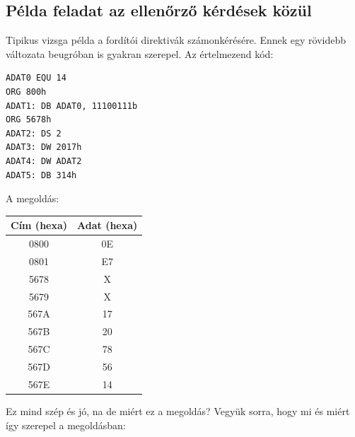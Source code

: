 \documentclass{article}
\begin{document}
\subsection{Példa feladat az ellenőrző kérdések közül}
Tipikus vizsga példa a fordítói direktivák számonkérésére. Ennek egy rövidebb változata beugróban is gyakran szerepel.
Az értelmezend kód:

\begin{lstlisting}[frame=single]
ADAT0 EQU 14
ORG 800h
ADAT1: DB ADAT0, 11100111b
ORG 5678h
ADAT2: DS 2
ADAT3: DW 2017h
ADAT4: DW ADAT2
ADAT5: DB 314h
\end{lstlisting}
A megoldás:

\begin{center}
\begin{tabular}{ |c|c| } 
 \hline
 Cím (hexa) & Adat (hexa) \\ \hline
 0800 & 0E \\ \hline
 0801 & E7 \\ \hline
 5678 & X \\ \hline
 5679 & X \\ \hline
 567A & 17 \\ \hline
 567B & 20 \\ \hline
 567C & 78 \\ \hline
 567D & 56 \\ \hline
 567E & 14 \\ \hline
\end{tabular}
\end{center}
Ez mind szép és jó, na de miért ez a megoldás? Vegyük sorra, hogy mi és miért így szerepel a megoldásban:
\end{document}
